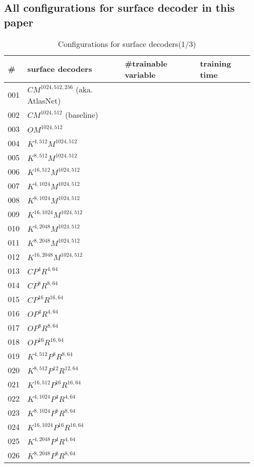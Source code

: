 \begin{appendices}
\section{All configurations for surface decoder in this paper}
\begin{table*}
	\caption{Configurations for surface decoders(1/3)}
	\label{tab:surf_dec1}
	\centering
	\begin{tabular}{| l | l | l | l }
		\hline
		\hline
		\#&surface decoders & \#trainable variable & training time \\
		\hline
		001&$CM^{1024,512,256}$ (aka. AtlasNet\cite{atlasnet})&~&~\\
		002&$CM^{1024,512}$ (baseline)&~&~\\
		003&$OM^{1024,512}$ &~&~\\
		004&$K^{4,512}M^{1024,512}$ &~&~\\
		005&$K^{8,512}M^{1024,512}$ &~&~\\
		006&$K^{16,512}M^{1024,512}$ &~&~\\
		007&$K^{4,1024}M^{1024,512}$ &~&~\\
		008&$K^{8,1024}M^{1024,512}$ &~&~\\
		009&$K^{16,1024}M^{1024,512}$ &~&~\\
		010&$K^{4,2048}M^{1024,512}$ &~&~\\
		011&$K^{8,2048}M^{1024,512}$ &~&~\\
		012&$K^{16,2048}M^{1024,512}$ &~&~\\
		013&$CP^4R^{4,64}$ &~&~\\
		014&$CP^{8}R^{8,64}$ &~&~\\
		015&$CP^{16}R^{16,64}$ &~&~\\
		016&$OP^4R^{4,64}$ &~&~\\
		017&$OP^{8}R^{8,64}$ &~&~\\
		018&$OP^{16}R^{16,64}$ &~&~\\
		019&$K^{4,512}P^{8}R^{8,64}$ &~&~\\
		020&$K^{8,512}P^{12}R^{12,64}$ &~&~\\
		021&$K^{16,512}P^{16}R^{16,64}$ &~&~\\
		022&$K^{4,1024}P^{4}R^{4,64}$ &~&~\\
		023&$K^{8,1024}P^{8}R^{8,64}$ &~&~\\
		024&$K^{16,1024}P^{16}R^{16,64}$ &~&~\\
		025&$K^{4,2048}P^{4}R^{4,64}$ &~&~\\
		026&$K^{8,2048}P^{8}R^{8,64}$ &~&~\\

\end{tabular}
\end{table*}
\end{appendices}

